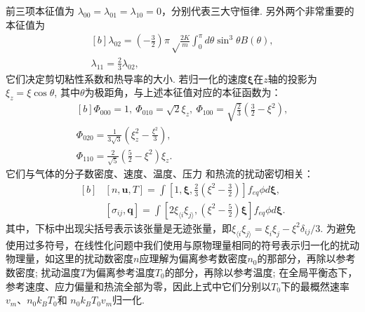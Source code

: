 前三项本征值为 $\lambda_{00}=\lambda_{01}=\lambda_{10}=0$，分别代表三大守恒律. 另外两个非常重要的本征值为
\begin{equation}\label{eigenvalues}
\begin{aligned}[b]
\lambda_{02}=\left(-\frac{3}{2}\right)\pi\sqrt\frac{2K}{m}\int_0^\pi{d\theta}\sin^3\theta B(\theta), \\
\lambda_{11}=\frac{2}{3}\lambda_{02}, 
\end{aligned}
\end{equation}
它们决定剪切粘性系数和热导率的大小. 若归一化的速度$\bm{\xi}$在$z$轴的投影为$\xi_z=\xi\cos\theta$, 其中$\theta$为极距角，与上述本征值对应的本征函数为：
\begin{equation*}\label{eigenfunctions}
\begin{aligned}[b]
\Phi_{000}=1, ~
\Phi_{010}=\sqrt{2}\xi_z, ~
\Phi_{100}=\sqrt{\frac{2}{3}}\left(\frac{3}{2}-\xi^2\right), \\
\Phi_{020}=\frac{1}{3\sqrt{3}}\left(\xi^2_z-\frac{\xi^2}{3}\right),\\
\Phi_{110}=\frac{2}{\sqrt{5}}\left(\frac{5}{2}-\xi^2\right)\xi_z.
\end{aligned}
\end{equation*}
它们与气体的分子数密度、速度、温度、压力 和热流的扰动密切相关：
\begin{equation}\label{MP_KineticModel}
\begin{aligned}[b]
&[{n},\bm{u}, T]=\int\left[1,\bm{\xi},\frac{2}{3}\left(\xi^2-\frac{3}{2}\right)\right]
{f_{eq}\phi}d\bm{\xi}, \\
&[\sigma_{ij},\bm{q}]=\int
\left[2\xi_{\langle i}\xi_{j\rangle}, \left(\xi^2 -\frac{5}{2}\right)\bm{\xi}\right]
f_{eq}\phi{}d\bm{\xi}.
\end{aligned}
\end{equation}
其中，下标中出现尖括号表示该张量是无迹张量，即$\xi_{\langle i}\xi_{j\rangle}=\xi_i\xi_j-\xi^2\delta_{ij}/3$. 
为避免使用过多符号，在线性化问题中我们使用与原物理量相同的符号表示归一化的扰动物理量，如这里的扰动数密度$n$应理解为偏离参考数密度$n_0$的那部分，再除以参考数密度; 扰动温度$T$为偏离参考温度$T_0$的部分，再除以参考温度; 在全局平衡态下，参考速度、应力偏量和热流全部为零，因此上式中它们分别以$T_0$下的最概然速率$v_m$、$n_0k_BT_0$和 $n_0k_BT_0v_m$归一化. 


